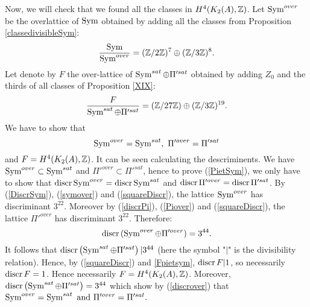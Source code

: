 Now, we will check that we found all the classes in $H^4(K_{ 2 }( A ),\mathbb{Z})$.
Let $\operatorname{Sym}^{over}$ be the overlattice of $\operatorname{Sym}$ obtained by adding all the classes from Proposition \ref{classedivisibleSym}:
\begin{equation}
\frac{\operatorname{Sym}}{\operatorname{Sym}^{over}}=(\mathbb{Z}/2\mathbb{Z})^7\oplus(\mathbb{Z}/3\mathbb{Z})^8. 
\label{symover} 
\end{equation}
Let denote by $F$ the over-lattice of $\operatorname{Sym}^{sat}\oplus \Pi'^{sat}$ obtained by adding $Z_0$ and the thirds of all classes of Proposition \ref{XIX}:
\begin{equation}
\frac{F}{\operatorname{Sym}^{sat}\oplus \Pi'^{sat}}=(\mathbb{Z}/27\mathbb{Z})\oplus(\mathbb{Z}/3\mathbb{Z})^{19}.
\label{Fpietsym}
\end{equation}
We have to show that 
\begin{equation}
\operatorname{Sym}^{over}=\operatorname{Sym}^{sat},\ \Pi'^{over}=\Pi'^{sat}
\label{PietSym}
\end{equation}
and $F=H^4(K_{ 2 }( A ),\mathbb{Z})$.
It can be seen calculating the descriminents. 
We have $\operatorname{Sym}^{over}\subset \operatorname{Sym}^{sat}$ and $\Pi'^{over}\subset\Pi'^{sat}$, hence to prove (\ref{PietSym}), we only have to show that 
$\operatorname{discr} \operatorname{Sym}^{over}=\operatorname{discr} \operatorname{Sym}^{sat}$ and $\operatorname{discr} \Pi'^{over}=\operatorname{discr}\Pi'^{sat}$.
By (\ref{DiscrSym}), (\ref{symover}) and (\ref{squareDiscr}), the lattice $\operatorname{Sym}^{over}$ has discriminant $3^{22}$. Moreover by (\ref{discrPi}), (\ref{Piover}) and (\ref{squareDiscr}), 
the lattice $\Pi'^{over}$ has discriminant $3^{22}$. Therefore:
\begin{equation}
\operatorname{discr}\left(\operatorname{Sym}^{over}\oplus \Pi'^{over}\right)=3^{44}.
\label{discrover}
\end{equation}
It follows that $\operatorname{discr} \left(\operatorname{Sym}^{sat}\oplus \Pi'^{sat}\right) | 3^{44}$ (here the symbol "$|$" is the divisibility relation).
Hence, by (\ref{squareDiscr}) and \ref{Fpietsym}, $\operatorname{discr} F | 1$, so necessarily $\operatorname{discr} F=1$. Hence necessarily $F=H^4(K_2(A),\mathbb{Z})$. Moreover, $\operatorname{discr} \left(\operatorname{Sym}^{sat}\oplus \Pi'^{sat}\right)=3^{44}$ 
which show by (\ref{discrover}) that $\operatorname{Sym}^{over}=\operatorname{Sym}^{sat} \text{ and } \Pi'^{over}=\Pi'^{sat}.$ 

